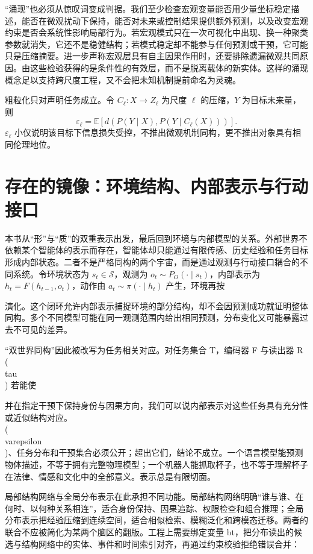 “涌现”也必须从惊叹词变成判据。我们至少检查宏观变量能否用少量坐标稳定描述，能否在微观扰动下保持，能否对未来或控制结果提供额外预测，以及改变宏观约束是否会系统性影响局部行为。若宏观模式只在一次可视化中出现、换一种聚类参数就消失，它还不是稳健结构；若模式稳定却不能参与任何预测或干预，它可能只是压缩摘要。进一步声称宏观层具有自主因果作用时，还要排除遗漏微观共同原因。由这些检验获得的是条件性的有效层，而不是脱离载体的新实体。这样的涌现概念足以支持跨尺度工程，又不会把未知机制提前命名为灵魂。

粗粒化只对声明任务成立。令 $C_\ell:X\to Z_\ell$ 为尺度 $\ell$ 的压缩，$Y$ 为目标未来量，则
\begin{equation}
\varepsilon_\ell=\mathbb E[d(P(Y\mid X),P(Y\mid C_\ell(X)))].
\end{equation}
$\varepsilon_\ell$ 小仅说明该目标下信息损失受控，不推出微观机制同构，更不推出对象具有相同伦理地位。

\section{存在的镜像：环境结构、内部表示与行动接口}

\label{sec:section_977}

本书从“形”与“质”的双重表示出发，最后回到环境与内部模型的关系。外部世界不依赖某个智能体的表示而存在，智能体却只能通过有限传感、历史经验和任务目标形成内部状态。二者不是严格同构的两个宇宙，而是通过观测与行动接口耦合的不同系统。令环境状态为 $s_t\in\mathcal S$，观测为 $o_t\sim P_O(\cdot\mid s_t)$，内部表示为 $h_t=F(h_{t-1},o_t)$，动作由 $a_t\sim\pi(\cdot\mid h_t)$ 产生，环境再按

演化。这个闭环允许内部表示捕捉环境的部分结构，却不会因预测成功就证明整体同构。多个不同模型可能在同一观测范围内给出相同预测，分布变化又可能暴露过去不可见的差异。

“双世界同构”因此被改写为任务相关对应。对任务集合 T，编码器 F 与读出器 R\\(\\tau\\) 若能使

并在指定干预下保持身份与因果方向，我们可以说内部表示对这些任务具有充分性或近似结构对应。\\(\\varepsilon\\)、任务分布和干预集合必须公开；超出它们，结论不成立。一个语言模型能预测物体描述，不等于拥有完整物理模型；一个机器人能抓取杯子，也不等于理解杯子在法律、情感和文化中的全部意义。表示总是有限切面。

局部结构网络与全局分布表示在此承担不同功能。局部结构网络明确“谁与谁、在何时、以何种关系相连”，适合身份保持、因果追踪、权限检查和组合推理；全局分布表示把经验压缩到连续空间，适合相似检索、模糊泛化和跨模态迁移。两者的联合不应被简化为某两个脑区的翻版。工程上需要绑定变量 bt，把分布读出的候选与结构网络中的实体、事件和时间索引对齐，再通过约束校验拒绝错误合并：

